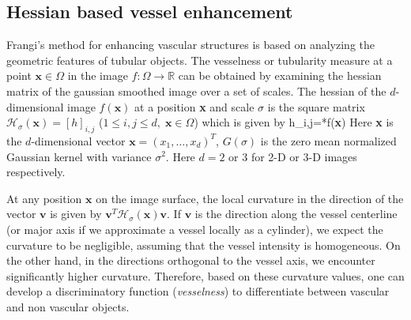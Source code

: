 \subsection{Hessian based vessel enhancement}
Frangi's \cite{frangi_vesselness} method for enhancing vascular structures is based on analyzing the geometric features of tubular objects. The vesselness or tubularity measure at a point $\textbf{x}\in \Omega$ in the image $f:\Omega \rightarrow \mathbb{R}$ can be obtained by examining the hessian matrix of the gaussian smoothed image over a set of scales. The hessian of the $d$-dimensional image $f(\textbf{x})$ at a position \textbf{x} and scale $\sigma$ is the square matrix $\mathcal{H}_{\sigma}(\textbf{x})=\left[ h \right]_{i,j} $ ($1\leq{i,j}\leq{d}, \; \textbf{x}\in\Omega$) which is given by
\bea
	 h_{i,j}=*f(\textbf{x})
\eea 
Here \textbf{x} is the $d$-dimensional vector $\textbf{x}=\left(x_1,\ldots, x_d \right)^T$, $G(\sigma)$ is the zero mean normalized Gaussian kernel with variance $\sigma^2$. Here $d=2 $ or 3 for 2-D or 3-D images respectively.

At any position $\textbf{x}$ on the image surface, the local curvature in the direction of the vector $\textbf{v}$ is given by $\textbf{v}^T\mathcal{H}_\sigma(\textbf{x})\textbf{v}$. If $\textbf{v}$ is the direction along the vessel centerline (or major axis if we approximate a vessel locally as a cylinder), we expect the curvature to be negligible, assuming that the vessel intensity is homogeneous. On the other hand, in the directions orthogonal to the vessel axis, we encounter significantly higher curvature. Therefore, based on these curvature values, one can develop a discriminatory function (\textit{vesselness}) to differentiate between vascular and non vascular objects.

